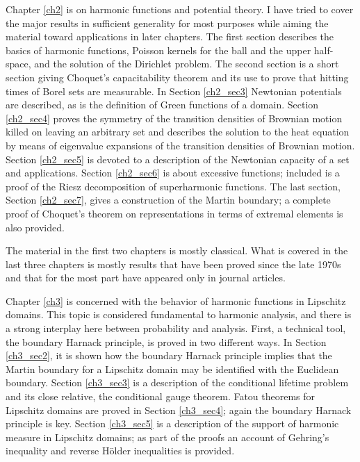 Chapter \ref{ch2} is on harmonic functions and potential theory. I have tried to cover the major results in sufficient generality for most purposes while aiming the material toward applications in later chapters. The first section describes the basics of harmonic functions, Poisson kernels for the ball and the upper half-space, and the solution of the Dirichlet problem. The second section is a short section giving Choquet's capacitability theorem and its use to prove that hitting times of Borel sets are measurable. In Section \ref{ch2_sec3} Newtonian potentials are described, as is the definition of Green functions of a domain. Section \ref{ch2_sec4} proves the symmetry of the transition densities of Brownian motion killed on leaving an arbitrary set and describes the solution to the heat equation by means of eigenvalue expansions of the transition densities of Brownian motion. Section \ref{ch2_sec5} is devoted to a description of the Newtonian capacity of a set and applications. Section \ref{ch2_sec6} is about excessive functions; included is a proof of the Riesz decomposition of superharmonic functions. The last section, Section \ref{ch2_sec7}, gives a construction of the Martin boundary; a complete proof of Choquet's theorem on representations in terms of extremal elements is also provided.

The material in the first two chapters is mostly classical. What is covered in the last three chapters is mostly results that have been proved since the late 1970s and that for the most part have appeared only in journal articles.

Chapter \ref{ch3} is concerned with the behavior of harmonic functions in Lipschitz domains. This topic is considered fundamental to harmonic analysis, and there is a strong interplay here between probability and analysis. First, a technical tool, the boundary Harnack principle, is proved in two different ways. In Section \ref{ch3_sec2}, it is shown how the boundary Harnack principle implies that the Martin boundary for a Lipschitz domain may be identified with the Euclidean boundary. Section \ref{ch3_sec3} is a description of the conditional lifetime problem and its close relative, the conditional gauge theorem. Fatou theorems for Lipschitz domains are proved in Section \ref{ch3_sec4}; again the boundary Harnack principle is key. Section \ref{ch3_sec5} is a description of the support of harmonic measure in Lipschitz domains; as part of the proofs an account of Gehring's inequality and reverse H\"older inequalities is provided.

